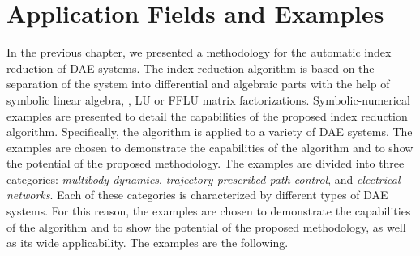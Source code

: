 
\chapter{Application Fields and Examples}
\label{chap4:applications}

In the previous chapter, we presented a methodology for the automatic index reduction of \ac{DAE} systems. The index reduction algorithm is based on the separation of the system into differential and algebraic parts with the help of symbolic linear algebra, \ie{}, \ac{LU} or \ac{FFLU} matrix factorizations. Symbolic-numerical examples are presented to detail the capabilities of the proposed index reduction algorithm. Specifically, the algorithm is applied to a variety of \ac{DAE} systems. The examples are chosen to demonstrate the capabilities of the algorithm and to show the potential of the proposed methodology. The examples are divided into three categories: \emph{multibody dynamics}, \emph{trajectory prescribed path control}, and \emph{electrical networks}. Each of these categories is characterized by different types of \ac{DAE} systems. For this reason, the examples are chosen to demonstrate the capabilities of the algorithm and to show the potential of the proposed methodology, as well as its wide applicability. The examples are the following.
%
